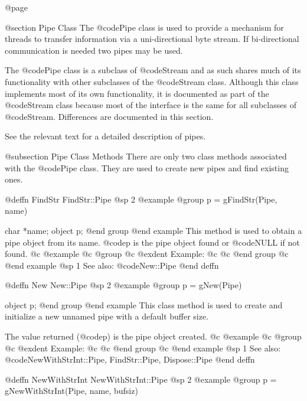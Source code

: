 @page

@section Pipe Class
The @code{Pipe} class is used to provide a mechanism for threads
to transfer information via a uni-directional byte stream.  If
bi-directional communication is needed two pipes may be used.

The @code{Pipe} class is a subclass of @code{Stream} and as such shares
much of its functionality with other subclasses of the @code{Stream}
class.  Although this class implements most of its own functionality, it
is documented as part of the @code{Stream} class because most of the
interface is the same for all subclasses of @code{Stream}.  Differences
are documented in this section.


See the relevant text for a detailed description of pipes.





@subsection Pipe Class Methods
There are only two class methods associated with the @code{Pipe} class.
They are used to create new pipes and find existing ones.








@deffn {FindStr} FindStr::Pipe
@sp 2
@example
@group
p = gFindStr(Pipe, name)

char    *name;
object  p;
@end group
@end example
This method is used to obtain a pipe object from its name.  @code{p}
is the pipe object found or @code{NULL} if not found.
@c @example
@c @group
@c @exdent Example:
@c 
@c @end group
@c @end example
@sp 1
See also:  @code{New::Pipe}
@end deffn





@deffn {New} New::Pipe
@sp 2
@example
@group
p = gNew(Pipe)

object  p;
@end group
@end example
This class method is used to create and initialize a new unnamed pipe
with a default buffer size.

The value returned (@code{p}) is the pipe object created.
@c @example
@c @group
@c @exdent Example:
@c 
@c @end group
@c @end example
@sp 1
See also:  @code{NewWithStrInt::Pipe, FindStr::Pipe, Dispose::Pipe}
@end deffn










@deffn {NewWithStrInt} NewWithStrInt::Pipe
@sp 2
@example
@group
p = gNewWithStrInt(Pipe, name, bufsiz)

